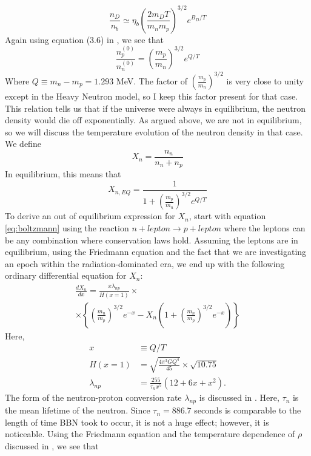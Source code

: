 \documentclass[aps,reprint,prl]{revtex4-1}
\begin{document}
\begin{equation}
\frac{n_D}{n_b}\simeq \eta_b\left(\frac{2m_D T}{m_nm_p}\right)^{3/2}e^{B_D/T}
\end{equation}
Again using equation (3.6) in \cite{Dodelson}, we see that
\begin{equation}
\frac{n_p^{(0)}}{n_n^{(0)}}=\left(\frac{m_p}{m_n}\right)^{3/2}e^{Q/T}
\end{equation}
Where $Q \equiv m_n-m_p=1.293$ MeV.  The factor of $\left(\frac{m_p}{m_n}\right)^{3/2}$ is very close to unity except in the Heavy Neutron model, so I keep this factor present for that case.  This relation tells us that if the universe were always in equilibrium, the neutron density would die off exponentially.  As argued above, we are not in equilibrium, so we will discuss the temperature evolution of the neutron density in that case.  We define
\begin{equation*}
X_n=\frac{n_n}{n_n+n_p}
\end{equation*}
In equilibrium, this means that
\begin{equation} \label{eq:xneq}
X_{n,EQ}=\frac{1}{1+\left(\frac{m_p}{m_n}\right)^{3/2}e^{Q/T}}
\end{equation}
To derive an out of equilibrium expression for $X_n$, start with equation \ref{eq:boltzmann} using the reaction $n+lepton\rightarrow p+lepton$ where the leptons can be any combination where conservation laws hold.  Assuming the leptons are in equilibrium, using the Friedmann equation and the fact that we are investigating an epoch within the radiation-dominated era, we end up with the following ordinary differential equation for $X_n$:
\begin{multline} \label{eq:diffeq}
\frac{dX_n}{dx}=\frac{x\lambda_{np}}{H(x=1)}\times \\ \times\left\{\left(\frac{m_n}{m_p}\right)^{3/2}e^{-x}-X_n\left(1+\left(\frac{m_n}{m_p}\right)^{3/2}e^{-x}\right)\right\}
\end{multline}
Here, 
\begin{align*}
x&\equiv Q/T \\
H(x=1)&=\sqrt{\frac{4\pi^3GQ^4}{45}}\times\sqrt{10.75} \\
\lambda_{np}&=\frac{255}{\tau_nx^5}(12+6x+x^2) .
\end{align*}
The form of the neutron-proton conversion rate $\lambda_{np}$ is discussed in \cite{Bernstein}.  Here, $\tau_n$ is the mean lifetime of the neutron.  Since $\tau_n=886.7$ seconds is comparable to the length of time BBN took to occur, it is not a huge effect; however, it is noticeable.  Using the Friedmann equation and the temperature dependence of $\rho$ discussed in \cite{Dodelson}, we see that
\end{document}
